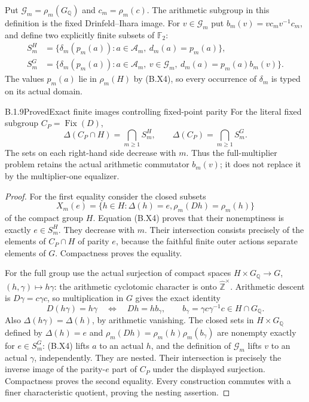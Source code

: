 Put $\mathcal G_m=\rho_m(G_{\mathbb Q})$ and $c_m=\rho_m(c)$.
The arithmetic subgroup in this definition is the fixed
Drinfeld--Ihara image.  For $v\in\mathcal G_m$ put
$b_m(v)=vc_mv^{-1}c_m$, and define two explicitly finite
subsets of $\mathbb F_2$:
\[
\begin{aligned}
 S_m^H&=\{\delta_m(p_m(a)):a\in\mathcal A_m,
                                  \ d_m(a)=p_m(a)\},\\
 S_m^G&=\{\delta_m(p_m(a)):
       a\in\mathcal A_m,\ v\in\mathcal G_m,
                    \ d_m(a)=p_m(a)b_m(v)\}.
\end{aligned}                                        \tag{B.X5}
\]
The values $p_m(a)$ lie in $\rho_m(H)$ by (B.X4), so
every occurrence of $\delta_m$ is typed on its actual domain.

\begin{result}{B.1.9}{Proved}{Exact finite images controlling fixed-point parity}
For the literal fixed subgroup $C_P=\operatorname{Fix}(D)$,
\[
 \Delta(C_P\cap H)=\bigcap_{m\ge1}S_m^H,
 \qquad
 \Delta(C_P)=\bigcap_{m\ge1}S_m^G.
 \tag{B.X6}
\]
The sets on each right-hand side decrease with $m$.
Thus the full-multiplier problem retains the actual
arithmetic commutator $b_m(v)$; it does not replace it
by the multiplier-one equalizer.
\end{result}
\begin{proof}
For the first equality consider the closed subsets
\[
 X_m(e)=\{h\in H:\Delta(h)=e,
                   \rho_m(Dh)=\rho_m(h)\}
 \tag{B.X7}
\]
of the compact group $H$.  Equation (B.X4) proves that
their nonemptiness is exactly $e\in S_m^H$.
They decrease with $m$.  Their intersection consists
precisely of the elements of $C_P\cap H$ of parity $e$,
because the faithful finite outer actions separate
elements of $G$.  Compactness proves the equality.

For the full group use the actual surjection of compact
spaces $H\times G_{\mathbb Q}\to G$, $(h,\gamma)\mapsto
h\gamma$: the arithmetic cyclotomic character is onto
$\widehat{\mathbb Z}^{\times}$.  Arithmetic descent is
$D\gamma=c\gamma c$, so multiplication in $G$ gives the
exact identity
\[
 D(h\gamma)=h\gamma
 \quad\Longleftrightarrow\quad
 Dh=h b_\gamma,
 \qquad b_\gamma=\gamma c\gamma^{-1}c\in H\cap G_{\mathbb Q}.
 \tag{B.X8}
\]
Also $\Delta(h\gamma)=\Delta(h)$, by arithmetic vanishing.
The closed sets in $H\times G_{\mathbb Q}$ defined by
$\Delta(h)=e$ and
$\rho_m(Dh)=\rho_m(h)\rho_m(b_\gamma)$ are nonempty
exactly for $e\in S_m^G$: (B.X4) lifts $a$ to an actual
$h$, and the definition of $\mathcal G_m$ lifts $v$ to
an actual $\gamma$, independently.  They are nested.
Their intersection is precisely the inverse image of
the parity-$e$ part of $C_P$ under the displayed
surjection.  Compactness proves the second equality.
Every construction commutes with a finer characteristic
quotient, proving the nesting assertion.
\end{proof}

